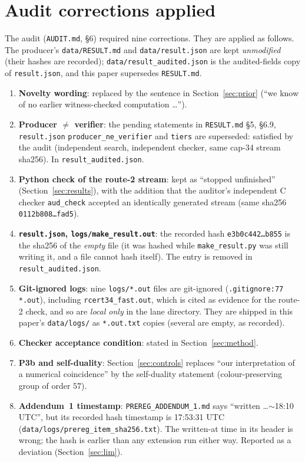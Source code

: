 \documentclass[10pt]{article}
\begin{document}
\section{Audit corrections applied}\label{sec:corr}
The audit (\texttt{AUDIT.md}, \S6) required nine corrections. They are applied as follows. The producer's \texttt{data/RESULT.md} and \texttt{data/result.json} are kept \emph{unmodified} (their hashes are recorded); \texttt{data/result\_audited.json} is the audited-fields copy of \texttt{result.json}, and this paper supersedes \texttt{RESULT.md}.
\begin{enumerate}\itemsep=1pt
\item \textbf{Novelty wording}: replaced by the sentence in Section~\ref{sec:prior} (``we know of no earlier witness-checked computation \dots'').
\item \textbf{Producer $\ne$ verifier}: the pending statements in \texttt{RESULT.md} \S5, \S6.9, \texttt{result.json} \texttt{producer\_ne\_verifier} and \texttt{tiers} are superseded: satisfied by the audit (independent search, independent checker, same cap-34 stream sha256). In \texttt{result\_audited.json}.
\item \textbf{Python check of the route-2 stream}: kept as ``stopped unfinished'' (Section~\ref{sec:results}), with the addition that the auditor's independent C checker \texttt{aud\_check} accepted an identically generated stream (same sha256 \texttt{0112b808\dots fad5}).
\item \textbf{\texttt{result.json}, \texttt{logs/make\_result.out}}: the recorded hash \texttt{e3b0c442\dots b855} is the sha256 of the \emph{empty} file (it was hashed while \texttt{make\_result.py} was still writing it, and a file cannot hash itself). The entry is removed in \texttt{result\_audited.json}.
\item \textbf{Git-ignored logs}: nine \texttt{logs/*.out} files are git-ignored (\texttt{.gitignore:77 *.out}), including \texttt{rcert34\_fast.out}, which is cited as evidence for the route-2 check, and so are \emph{local only} in the lane directory. They are shipped in this paper's \texttt{data/logs/} as \texttt{*.out.txt} copies (several are empty, as recorded).
\item \textbf{Checker acceptance condition}: stated in Section~\ref{sec:method}.
\item \textbf{P3b and self-duality}: Section~\ref{sec:controls} replaces ``our interpretation of a numerical coincidence'' by the self-duality statement (colour-preserving group of order $57$).
\item \textbf{Addendum~1 timestamp}: \texttt{PREREG\_ADDENDUM\_1.md} says ``written \dots $\sim$18:10 UTC'', but its recorded hash timestamp is 17:53:31 UTC (\texttt{data/logs/prereg\_item\_sha256.txt}). The written-at time in its header is wrong; the hash is earlier than any extension run either way. Reported as a deviation (Section~\ref{sec:lim}).

\end{enumerate}
\end{document}
